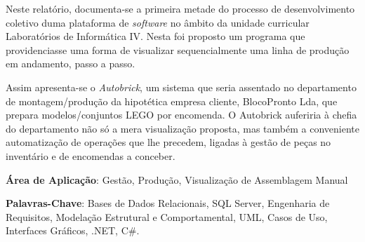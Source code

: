 \documentclass[a4paper,12pt]{scrreprt}
\begin{document}



\makecover








\renewenvironment{abstract}
 {\par\noindent\textbf{\Large\abstractname}\par\bigskip}
 {}

\begin{flushleft}
\begin{abstract}
    
    Neste relatório, documenta-se a primeira metade do processo de desenvolvimento coletivo duma plataforma de \textit{software} no âmbito da unidade curricular Laboratórios de Informática IV. Nesta foi proposto um programa que providenciasse uma forma de visualizar sequencialmente uma linha de produção em andamento, passo a passo.

    Assim apresenta-se o \textit{Autobrick}, um sistema que seria assentado no departamento de montagem/produção da hipotética empresa cliente, BlocoPronto Lda, que prepara modelos/conjuntos LEGO por encomenda. O Autobrick auferiria à chefia do departamento não só a mera visualização proposta, mas também a conveniente automatização de operações que lhe precedem, ligadas à gestão de peças no inventário e de encomendas a conceber.
    
    \par \textbf{Área de Aplicação}: Gestão, Produção, Visualização de Assemblagem Manual 
    \par \textbf{Palavras-Chave}: Bases de Dados Relacionais, SQL Server, Engenharia de Requisitos, Modelação Estrutural e Comportamental, UML, Casos de Uso, Interfaces Gráficos, .NET, C\#.
    
\end{abstract}
\end{flushleft}
\end{document}
